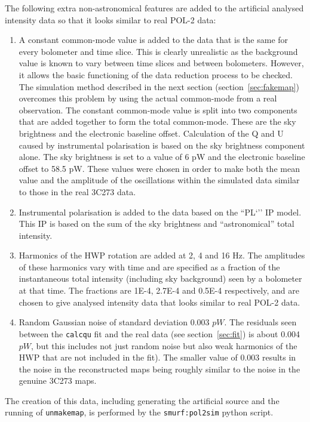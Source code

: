 \documentclass[twoside,11pt]{starlink}
\begin{document}
The following extra non-astronomical features are added to the artificial
analysed intensity data so that it looks similar to real POL-2 data:
\begin{enumerate}
\item A constant common-mode value is added to the data that is the same
for every bolometer and time slice. This is clearly unrealistic as the
background value is known to vary between time slices and between
bolometers. However, it allows the basic functioning of the data
reduction process to be checked. The simulation method described in the
next section (section~\ref{sec:fakemap}) overcomes this problem by using
the actual common-mode from a real observation. The constant common-mode
value is split into two components that are added together to form the
total common-mode. These are the sky brightness and the electronic
baseline offset. Calculation of the Q and U caused by instrumental
polarisation is based on the sky brightness component alone. The sky
brightness is set to a value of 6 pW and the electronic baseline offset
to 58.5 pW. These values were chosen in order to make both the mean value
and the amplitude of the oscillations within the simulated data similar to
those in the real 3C273 data.
\item Instrumental polarisation is added to the data based on the ``PL`'' IP
model. This IP is based on the sum of the sky brightness and ``astronomical''
total intensity.
\item Harmonics of the HWP rotation are added at 2, 4 and 16 Hz. The amplitudes
of these harmonics vary with time and are specified as a fraction of
the instantaneous total intensity (including sky background) seen by
a bolometer at that time. The fractions are 1E-4, 2.7E-4 and 0.5E-4
respectively, and are chosen to give analysed intensity data that looks
similar to real POL-2 data.
\item Random Gaussian noise of standard deviation 0.003 $pW$. The residuals
seen between the \texttt{calcqu} fit and the real data (see
section~\ref{sec:fit}) is about 0.004 $pW$, but this includes not just
random noise but also weak harmonics of the HWP that are not included in
the fit). The smaller value of 0.003 results in the noise in the
reconstructed maps being roughly similar to the noise in the genuine 3C273
maps.
\end{enumerate}

The creation of this data, including generating the artificial source and
the running of \texttt{unmakemap}, is performed by the
\texttt{smurf:pol2sim} python script.
\end{document}
